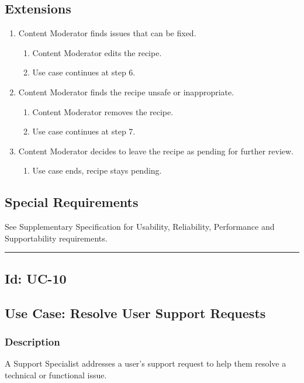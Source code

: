\documentclass[10pt,letterpaper]{article}
\newcommand{\ucseparator}{\vspace{1em}\noindent\rule{\linewidth}{0.4pt}\vspace{1.5em}}
\begin{document}
\subsection*{Extensions}
\begin{enumerate}
    \item[5a.] Content Moderator finds issues that can be fixed.
    \begin{enumerate}
        \item[1.] Content Moderator edits the recipe.
        \item[2.] Use case continues at step 6.
    \end{enumerate}
    \item[5b.] Content Moderator finds the recipe unsafe or inappropriate.
    \begin{enumerate}
        \item[1.] Content Moderator removes the recipe.
        \item[2.] Use case continues at step 7.
    \end{enumerate}
    \item[6a.] Content Moderator decides to leave the recipe as pending for further review.
    \begin{enumerate}
        \item[1.] Use case ends, recipe stays pending.
    \end{enumerate}
\end{enumerate}

\subsection*{Special Requirements}
See Supplementary Specification for Usability, Reliability, Performance and Supportability requirements.

\ucseparator

\subsection*{Id: UC-10}

\subsection*{Use Case: Resolve User Support Requests}

\subsubsection*{Description}
A Support Specialist addresses a user's support request to help them resolve a technical or functional issue.
\end{document}
